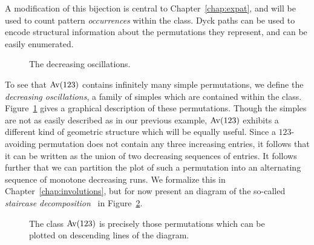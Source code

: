     A modification of this bijection is central to Chapter~\ref{chap:expat},
    and will be used to count pattern \emph{occurrences} within the class.
    Dyck paths can be used to encode structural information about the
    permutations they represent, and can be easily enumerated. 


    \begin{figure}[t] \centering
    \caption{The decreasing oscillations.}
    \label{prelim:fig:oscillation}
    \end{figure}

    To see that $\operatorname{{Av}} (123)$ contains infinitely many simple permutations, we
    define the \emph{decreasing oscillations}, a family of simples which are
    contained within the class. Figure~\ref{prelim:fig:oscillation} gives a
    graphical description of these permutations. 
    Though the simples are not as easily described as in our previous example,
    $\operatorname{{Av}}(123)$ exhibits a different kind of geometric structure which will be
    equally useful. Since a $123$-avoiding permutation does not contain any
    three increasing entries, it follows that it can be written as the union of
    two decreasing sequences of entries. It follows further that we can
    partition the plot of such a permutation into an alternating sequence of
    monotone decreasing runs. We formalize this in
    Chapter~\ref{chap:involutions}, but for now present an diagram of the
    so-called \emph{staircase decomposition}~\cite{Albert2010, me-involutions}
    in Figure~\ref{prelim:fig:staircase}.


    \begin{figure}[t] \centering
    \caption{The class $\operatorname{{Av}}(123)$ is precisely those permutations which can be
             plotted on descending lines of the diagram.}
    \label{prelim:fig:staircase}
    \end{figure}

